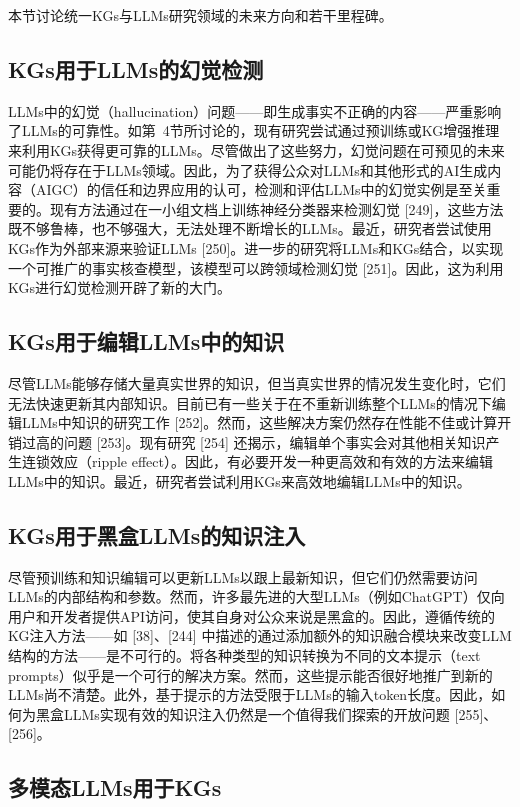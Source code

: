 本节讨论统一KGs与LLMs研究领域的未来方向和若干里程碑。

\subsection{KGs用于LLMs的幻觉检测}

LLMs中的幻觉（hallucination）问题——即生成事实不正确的内容——严重影响了LLMs的可靠性。如第~4节所讨论的，现有研究尝试通过预训练或KG增强推理来利用KGs获得更可靠的LLMs。尽管做出了这些努力，幻觉问题在可预见的未来可能仍将存在于LLMs领域。因此，为了获得公众对LLMs和其他形式的AI生成内容（AIGC）的信任和边界应用的认可，检测和评估LLMs中的幻觉实例是至关重要的。现有方法通过在一小组文档上训练神经分类器来检测幻觉 [249]，这些方法既不够鲁棒，也不够强大，无法处理不断增长的LLMs。最近，研究者尝试使用KGs作为外部来源来验证LLMs [250]。进一步的研究将LLMs和KGs结合，以实现一个可推广的事实核查模型，该模型可以跨领域检测幻觉 [251]。因此，这为利用KGs进行幻觉检测开辟了新的大门。

\subsection{KGs用于编辑LLMs中的知识}

尽管LLMs能够存储大量真实世界的知识，但当真实世界的情况发生变化时，它们无法快速更新其内部知识。目前已有一些关于在不重新训练整个LLMs的情况下编辑LLMs中知识的研究工作 [252]。然而，这些解决方案仍然存在性能不佳或计算开销过高的问题 [253]。现有研究 [254] 还揭示，编辑单个事实会对其他相关知识产生连锁效应（ripple effect）。因此，有必要开发一种更高效和有效的方法来编辑LLMs中的知识。最近，研究者尝试利用KGs来高效地编辑LLMs中的知识。

\subsection{KGs用于黑盒LLMs的知识注入}

尽管预训练和知识编辑可以更新LLMs以跟上最新知识，但它们仍然需要访问LLMs的内部结构和参数。然而，许多最先进的大型LLMs（例如ChatGPT）仅向用户和开发者提供API访问，使其自身对公众来说是黑盒的。因此，遵循传统的KG注入方法——如 [38]、[244] 中描述的通过添加额外的知识融合模块来改变LLM结构的方法——是不可行的。将各种类型的知识转换为不同的文本提示（text prompts）似乎是一个可行的解决方案。然而，这些提示能否很好地推广到新的LLMs尚不清楚。此外，基于提示的方法受限于LLMs的输入token长度。因此，如何为黑盒LLMs实现有效的知识注入仍然是一个值得我们探索的开放问题 [255]、[256]。

\subsection{多模态LLMs用于KGs}

